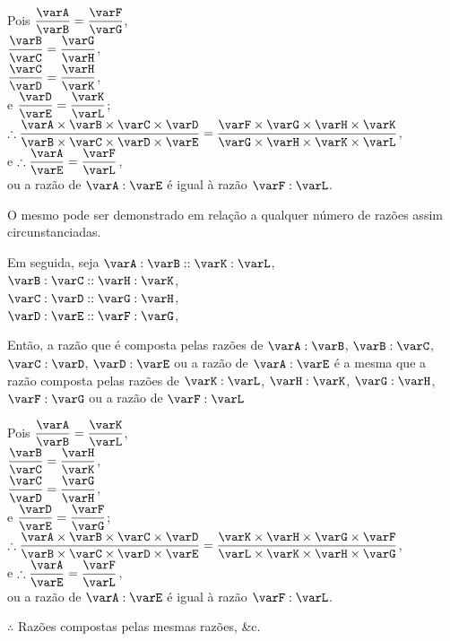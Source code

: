 \documentclass[booklanguage=brazilian]{byrnebook}
\begin{document}
\begin{center}
Pois $\dfrac{\varA}{\varB} = \dfrac{\varF}{\varG}$,\\
$\dfrac{\varB}{\varC} = \dfrac{\varG}{\varH}$,\\
$\dfrac{\varC}{\varD} = \dfrac{\varH}{\varK}$,\\
e $\dfrac{\varD}{\varE} = \dfrac{\varK}{\varL}$;\\
$\therefore \dfrac{\varA \times \varB \times \varC \times \varD}{\varB \times \varC \times \varD \times \varE} = \dfrac{\varF \times \varG \times \varH \times \varK}{\varG \times \varH \times \varK \times \varL}$,\\
e $\therefore \dfrac{\varA}{\varE} = \dfrac{\varF}{\varL}$,\\
ou a razão de $\varA : \varE$ é igual à razão $\varF : \varL$.
\end{center}

O mesmo pode ser demonstrado em relação a qualquer número de razões assim circunstanciadas.

\begin{center}
Em seguida, seja $\varA : \varB :: \varK : \varL$,\\
 $\varB : \varC :: \varH : \varK$,\\
$\varC : \varD :: \varG : \varH$,\\
$\varD : \varE :: \varF : \varG$,
\end{center}

Então, a razão que é composta pelas razões de $\varA : \varB$, $\varB : \varC$, $\varC : \varD$, $\varD : \varE$ ou a razão de $\varA : \varE$ é a mesma que a razão composta pelas razões de $\varK : \varL$, $\varH : \varK$, $\varG : \varH$, $\varF : \varG$ ou a razão de $\varF : \varL$

\begin{center}
Pois $\dfrac{\varA}{\varB} = \dfrac{\varK}{\varL}$,\\
$\dfrac{\varB}{\varC} = \dfrac{\varH}{\varK}$,\\
$\dfrac{\varC}{\varD} = \dfrac{\varG}{\varH}$,\\
e $\dfrac{\varD}{\varE} = \dfrac{\varF}{\varG}$;\\
$\therefore \dfrac{\varA \times \varB \times \varC \times \varD}{\varB \times \varC \times \varD \times \varE} = \dfrac{\varK \times \varH \times \varG \times \varF}{\varL \times \varK \times \varH \times \varG}$,\\
e $\therefore \dfrac{\varA}{\varE} = \dfrac{\varF}{\varL}$,\\
ou a razão de $\varA : \varE$ é igual à razão $\varF : \varL$.

$\therefore$ Razões compostas pelas mesmas razões, \&c.
\end{center}
\vfill\pagebreak
\end{document}

